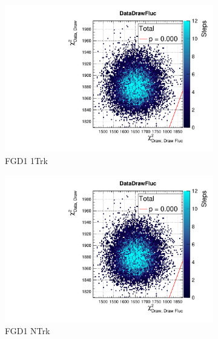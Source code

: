 \begin{figure}[h]
\begin{subfigure}[t]{0.24\textwidth}
	\includegraphics[width=\textwidth, trim={20mm 6mm 4mm 11mm}, clip,page=59]{figures/mach3/data/postpred/2017b_NewData_NewDet_UpdXsecStep_2Xsec_4Det_5Flux_0_PostPred_procs}
	\caption{FGD1 1Trk}
\end{subfigure}
\begin{subfigure}[t]{0.24\textwidth}
	\includegraphics[width=\textwidth, trim={20mm 6mm 4mm 11mm}, clip,page=68]{figures/mach3/data/postpred/2017b_NewData_NewDet_UpdXsecStep_2Xsec_4Det_5Flux_0_PostPred_procs}
	\caption{FGD1 NTrk}
\end{subfigure}
\begin{subfigure}[t]{0.24\textwidth}

\end{subfigure}
\end{figure}
